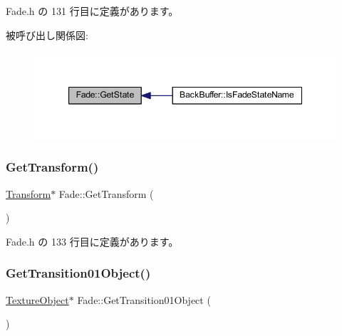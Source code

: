  Fade.\+h の 131 行目に定義があります。

被呼び出し関係図\+:\nopagebreak
\begin{figure}[H]
\begin{center}
\leavevmode
\includegraphics[width=347pt]{class_fade_aeb41dfcadf75dd4c980da68e243cc310_icgraph}
\end{center}
\end{figure}
\mbox{\label{class_fade_a1a177209e72a27858ceb2d339321e9c4}} 
\subsubsection{\texorpdfstring{Get\+Transform()}{GetTransform()}}
{\footnotesize\ttfamily \mbox{\hyperlink{class_transform}{Transform}}$\ast$ Fade\+::\+Get\+Transform (\begin{DoxyParamCaption}{ }\end{DoxyParamCaption})\hspace{0.3cm}{\ttfamily [inline]}}



 Fade.\+h の 133 行目に定義があります。

\mbox{\label{class_fade_a4e047c532d430095e7d0d70288289a82}} 
\subsubsection{\texorpdfstring{Get\+Transition01\+Object()}{GetTransition01Object()}}
{\footnotesize\ttfamily \mbox{\hyperlink{class_texture_object}{Texture\+Object}}$\ast$ Fade\+::\+Get\+Transition01\+Object (\begin{DoxyParamCaption}{ }\end{DoxyParamCaption})\hspace{0.3cm}{\ttfamily [inline]}}



